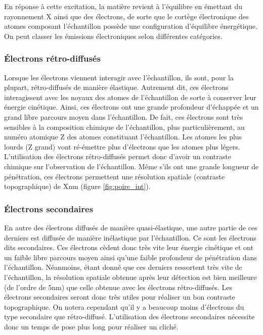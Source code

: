 \documentclass[a4paper,12pt]{article}
\begin{document}
En réponse à cette excitation, la matière revient à l'équilibre en émettant du rayonnement X ainsi que des électrons, 
de sorte que le cortège électronique des atomes composant l'échantillon possède une configuration d'équilibre énergétique. 
On peut classer les émissions électroniques selon différentes catégories.

\subsubsection*{Électrons rétro-diffusés}
Lorsque les électrons viennent interagir avec l'échantillon, ils sont, pour la plupart, rétro-diffusés de manière élastique.
Autrement dit, ces électrons interagissent avec les noyaux des atomes de l'échantillon de sorte à conserver leur énergie cinétique.
Ainsi, ces électrons ont une grande profondeur d'échappée et un grand libre parcours moyen dans l'échantillon.
De fait, ces électrons sont très sensibles à la composition chimique de l'échantillon, plus particulièrement, 
au numéro atomique Z des atomes constituant l'échantillon.
Les atomes les plus lourds (Z grand) vont ré-émettre plus d'électrons que les atomes plus légers. L'utilisation des électrons rétro-diffusés permet donc d'avoir un contraste chimique sur l'observation de l'échantillon.
Même s'ils ont une grande longueur de pénétration, ces électrons permettent une résolution spatiale (contraste topographique) de Xnm (figure \ref{fig:poire_int}).

\subsubsection*{Électrons secondaires}
En autre des électrons diffusés de manière quasi-élastique, une autre partie de ces derniers est diffusée de manière inélastique par l'échantillon.
Ce sont les électrons dits secondaires. 
Ces électrons cèdent donc très vite leur énergie cinétique et ont un faible libre parcours moyen ainsi qu'une faible profondeur de pénétration dans l'échantillon. 
Néanmoins, étant donné que ces derniers ressortent très vite de l'échantillon, la résolution spatiale obtenue 
après leur détection est bien meilleure (de l'ordre de $5$nm) que celle obtenue avec les électrons rétro-diffusés.
Les électrons secondaires seront donc très utiles pour réaliser un bon contraste topographique.
On notera cependant qu'il y a beaucoup moins d'électrons du type secondaire que rétro-diffusé. 
L'utilisation des électrons secondaires nécessite donc un temps de pose plus long pour réaliser un cliché.
\end{document}
